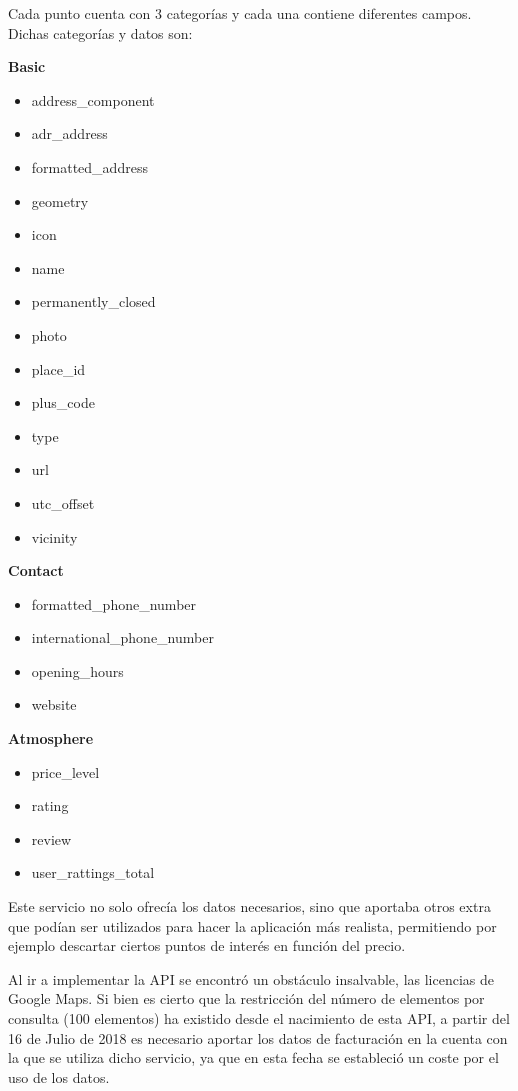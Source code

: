 Cada punto cuenta con 3 categorías y cada una contiene diferentes campos. Dichas categorías y datos son:

\textbf{Basic}
\begin{itemize}
\tightlist
\item address\_component
\item adr\_address
\item formatted\_address
\item geometry
\item icon
\item name
\item permanently\_closed
\item photo
\item place\_id
\item plus\_code
\item type
\item url
\item utc\_offset
\item vicinity
\end{itemize}

\textbf{Contact}
\begin{itemize}
\tightlist
\item formatted\_phone\_number
\item international\_phone\_number
\item opening\_hours
\item website
\end{itemize}

\textbf{Atmosphere}
\begin{itemize}
\tightlist
\item price\_level
\item rating
\item review
\item user\_rattings\_total
\end{itemize}

Este servicio no solo ofrecía los datos necesarios, sino que aportaba otros extra que podían ser utilizados para hacer la aplicación más realista, permitiendo por ejemplo descartar ciertos puntos de interés en función del precio.

Al ir a implementar la API se encontró un obstáculo insalvable, las licencias de Google Maps.
Si bien es cierto que la restricción del número de elementos por consulta (100 elementos) ha existido desde el nacimiento de esta API, a partir del 16 de Julio de 2018 es necesario aportar los datos de facturación en la cuenta con la que se utiliza dicho servicio, ya que en esta fecha se estableció un coste por el uso de los datos.

